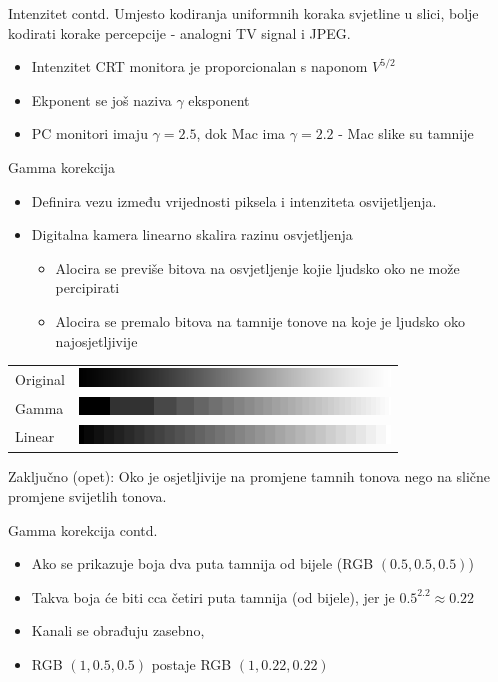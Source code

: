 \documentclass[9pt]{beamer}
\begin{document}
\begin{frame}{Intenzitet contd.}
	Umjesto kodiranja uniformnih koraka svjetline u slici, bolje kodirati korake percepcije - analogni TV signal i JPEG.
	\begin{itemize}
		\item Intenzitet CRT monitora je proporcionalan s naponom $V^{5/2}$ 
		\item Ekponent se još naziva $\gamma$ eksponent
		\item PC monitori imaju $\gamma = 2.5$, dok Mac ima $\gamma = 2.2$ - Mac slike su tamnije
	\end{itemize}
	
\end{frame}

\begin{frame}{Gamma korekcija}
	\begin{itemize}
		\item Definira vezu između vrijednosti piksela i intenziteta osvijetljenja.
		\item Digitalna kamera linearno skalira razinu osvjetljenja
		\begin{itemize}
			\item Alocira se previše bitova na osvjetljenje kojie ljudsko oko ne može percipirati
			\item Alocira se premalo bitova na tamnije tonove na koje je ljudsko oko najosjetljivije
		\end{itemize}
	\end{itemize}
	
	\begin{tabular}{ll}
		Original &\includegraphics[height=0.5cm]{slike/05_gamma_gradient3b.png}\\
		Gamma&  \includegraphics[height=0.5cm]{slike/05_gamma_gradient2b.png}\\
		Linear&  \includegraphics[height=0.5cm]{slike/05_gamma_gradient1b.png}
	\end{tabular}
	Zaključno (opet): Oko je osjetljivije na promjene tamnih tonova nego na slične promjene svijetlih tonova.
	
\end{frame}
\begin{frame}{Gamma korekcija contd. }
	\begin{itemize}
		\item Ako se prikazuje boja dva puta tamnija od bijele (RGB $(0.5, 0.5, 0.5)$)
		\item Takva boja će biti cca četiri puta tamnija (od bijele), jer je $0.5^{2.2} \approx 0.22$
		\item Kanali se obrađuju zasebno,  
		\item RGB $(1, 0.5, 0.5)$ postaje RGB $(1, 0.22, 0.22)$
	\end{itemize}
\end{frame}
\end{document}
